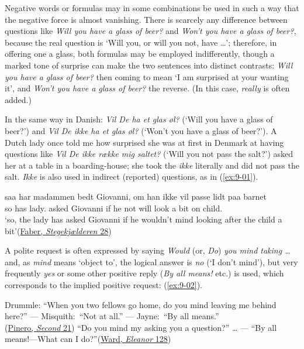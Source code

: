 \label{ch:9}
Negative words or formulas may in some combinations be used in such a way that the negative force is almost vanishing. There is scarcely any difference between questions like \textit{Will you have a glass of beer?} and \textit{Won't you have a glass of beer?}, because the real question is `Will you, or will you not, have {\dots}'; therefore, in offering one a glass, both formulas may be employed indifferently, though a marked tone of surprise can make the two sentences into distinct contrasts: \textit{Will you have a glass of beer?} then coming to mean `I am surprised at your wanting it', and \textit{Won't you have a glass of beer?} the reverse. (In this case, \textit{really} is often added.) 

In the same way in Danish: \textit{Vil De ha et glas øl?} (`Will you have a glass of beer?') and \textit{Vil De ikke ha et glas øl?} (`Won't you have a glass of beer?'). A Dutch lady once told me how surprised she was at first in Denmark at having questions like \textit{Vil De ikke række mig saltet?} (`Will you not pass the salt?') asked her at a table in a boarding-house; she took the \textit{ikke} literally and did not pass the salt. \textit{Ikke} is also used in indirect (reported) questions, as in (\ref{ex:9-01}).\largerpage[-2]

\ea \label{ex:9-01}
 \gll saa har madammen bedt Giovanni, om han ikke vil passe lidt paa barnet\\
 so has lady.\DEF{} asked Giovanni if he not will look {a bit} on child.\DEF{}\\\normalsize
\glt `so, the lady has asked Giovanni if he wouldn't mind looking after the child a bit'\hfill(\href{https://www.kb.dk/e-mat/dod/130024712320-color.pdf}{Faber, \textit{Stegekjælderen} 28}) %
\z

A polite request is often expressed by saying \textit{Would} (or, \textit{Do}) \textit{you mind taking {\dots}} and, as \textit{mind} means `object to', the logical answer is \textit{no} (`I don't mind'), but very frequently \textit{yes} or some other positive reply (\textit{By all means!} etc.) is used, which corresponds to the implied positive request: (\ref{ex:9-02}).

\ea \label{ex:9-02}
\ea
Drummle: ``When you two fellows go home, do you mind leaving me behind here?'' --- Misquith:~``Not at all.'' --- Jayne:~``By all means.''\\\hfill(\href{https://archive.org/details/thesecondmrstanq00pineuoft/page/20/mode/2up?q=%22when+you+two+fellows%22&view=theater}{Pinero, \textit{Second} 21})
\ex ``Do you mind my asking you a question?'' {\dots} --- ``By all means!---What can I do?''\hfill(\href{https://archive.org/details/cu31924013567130/page/160/mode/2up?q=%22do+you+mind+my%22&view=theater}{Ward, \textit{Eleanor} 128}) %
\z
\z


